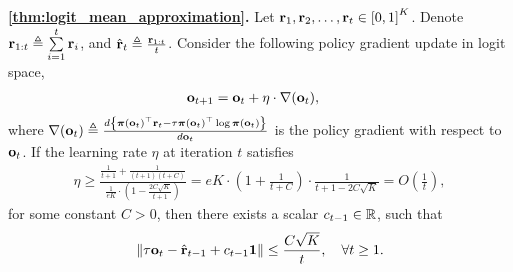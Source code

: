 {\bf \cref{thm:logit_mean_approximation}.} Let ${\mathbf{r}}_1, {\mathbf{r}}_2, \dots, {\mathbf{r}}_t \in \left[ 0, 1  \right]^K$. Denote ${\mathbf{r}}_{1:t} \triangleq \sum\limits_{i=1}^{t}{{\mathbf{r}}_i}$, and $\hat{{\mathbf{r}}}_t \triangleq \frac{{\mathbf{r}}_{1:t}}{t}$. Consider the following policy gradient update in logit space,
\begin{equation*}
\begin{split}
    {\mathbf{o}}_{t+1} &= {\mathbf{o}}_t + \eta \cdot \nabla({\mathbf{o}}_t),
\end{split}
\end{equation*}
where $\nabla({\mathbf{o}}_t) \triangleq \frac{d \left\{ {\boldsymbol{\pi}}({\mathbf{o}}_t)^\top {\mathbf{r}}_t - \tau {\boldsymbol{\pi}}({\mathbf{o}}_t)^\top \log{{\boldsymbol{\pi}}({\mathbf{o}}_t)} \right\} }{d {\mathbf{o}}_t} $ is the policy gradient with respect to ${\mathbf{o}}_t$. If the learning rate $\eta$ at iteration $t$ satisfies
\begin{equation*}
\begin{split}
    \eta \ge \frac{ \frac{1}{t+1} + \frac{1}{(t+1)(t+C)} }{ \frac{1}{e K} \cdot \left( 1 - \frac{2 C \sqrt{K}}{t+1} \right)  } = e K \cdot \left( 1 + \frac{1}{t+C} \right) \cdot \frac{1}{t+1-2C\sqrt{K}} = O\left( \frac{1}{t} \right),
\end{split}
\end{equation*}
for some constant $C > 0$, then there exists a scalar $c_{t-1} \in {\mathbb{R}}$, such that
\begin{equation*}
    \left\| \tau {\mathbf{o}}_{t} - \hat{{\mathbf{r}}}_{t-1} + c_{t-1} {\mathbf{1}} \right\| \le \frac{C \sqrt{K}}{t}, \quad \forall t \ge 1.
\end{equation*}
